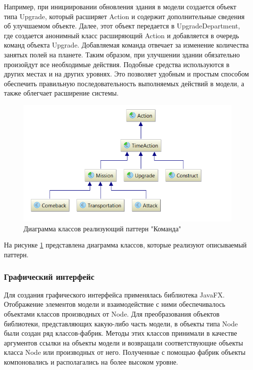 Например, при инициировании обновления здания в модели создается объект типа Upgrade, который расширяет Action и содержит дополнительные сведения об улучшаемом объекте. Далее, этот объект передается в UpgradeDepartment, где создается анонимный класс расширяющий Action и добавляется в очередь команд объекта Upgrade. Добавляемая команда отвечает за изменение количества занятых полей на планете. Таким образом, при улучшении здании обязательно произойдут все необходимые действия. Подобные средства используются в других местах и на других уровнях. Это позволяет удобным и простым способом обеспечить правильную последовательность выполняемых действий в модели, а также облегчает расширение системы. 

\begin{figure}[H]
\centering
\includegraphics[scale=0.5]{d3.png}
\caption{Диаграмма классов  реализующий паттерн "Команда"}
\label{pic:d3}
\end{figure}

На рисунке \ref{pic:d3} представлена диаграмма классов, которые реализуют описываемый паттерн.

\subsubsection{Графический интерфейс}
Для создания графического интерфейса применялась библиотека JavaFX. Отображение элементов модели и взаимодействие с ними обеспечивалось объектами классов производных от Node. Для преобразования объектов библиотеки, представляющих какую-либо часть модели, в объекты типа Node были создан ряд классов-фабрик. Методы этих классов принимали в качестве аргументов ссылки на объекты модели и возвращали соответствующие объекты класса Node или производных от него. Полученные с помощью фабрик объекты компоновались и располагались на более высоком уровне.

